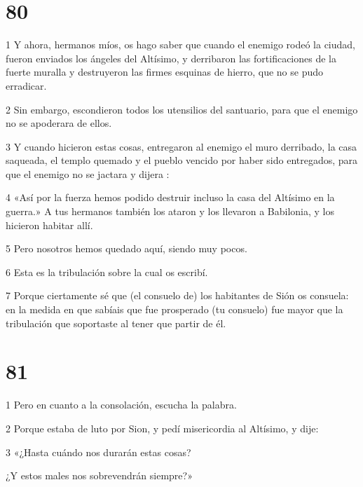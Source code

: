 \chapter{80}

\par 1 Y ahora, hermanos míos, os hago saber que cuando el enemigo rodeó la ciudad, fueron enviados los ángeles del Altísimo, y derribaron las fortificaciones de la fuerte muralla y destruyeron las firmes esquinas de hierro, que no se pudo erradicar.

\par 2 Sin embargo, escondieron todos los utensilios del santuario, para que el enemigo no se apoderara de ellos.

\par 3 Y cuando hicieron estas cosas, entregaron al enemigo el muro derribado, la casa saqueada, el templo quemado y el pueblo vencido por haber sido entregados, para que el enemigo no se jactara y dijera :

\par 4 «Así por la fuerza hemos podido destruir incluso la casa del Altísimo en la guerra.» A tus hermanos también los ataron y los llevaron a Babilonia, y los hicieron habitar allí.

\par 5 Pero nosotros hemos quedado aquí, siendo muy pocos.

\par 6 Esta es la tribulación sobre la cual os escribí.

\par 7 Porque ciertamente sé que (el consuelo de) los habitantes de Sión os consuela: en la medida en que sabíais que fue prosperado (tu consuelo) fue mayor que la tribulación que soportaste al tener que partir de él.

\chapter{81}

\par 1 Pero en cuanto a la consolación, escucha la palabra.

\par 2 Porque estaba de luto por Sion, y pedí misericordia al Altísimo, y dije:

\par 3 «¿Hasta cuándo nos durarán estas cosas?

\par ¿Y estos males nos sobrevendrán siempre?»

